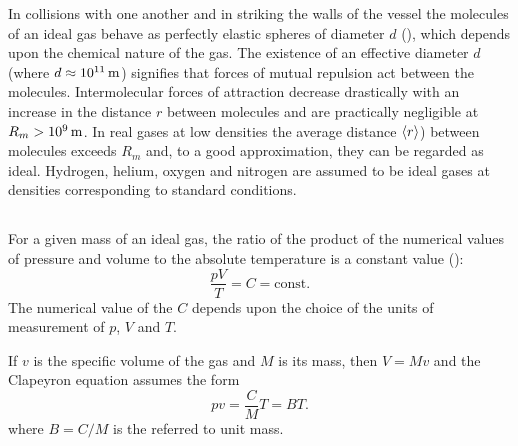 In collisions with one another and in striking the walls of the vessel the molecules of an ideal gas behave as perfectly elastic spheres  of diameter $d$ (), which depends upon the chemical nature of the gas. The existence of an effective diameter $d$ (where $d \approx \SI{d11}{\meter}$) signifies that forces of mutual repulsion  act between the molecules. Intermolecular forces of attraction  decrease drastically with an increase in the distance $r$ between molecules and are practically negligible at $ R_{m} > \SI{d9}{\meter}$. In real gases at low densities the average distance $\expval{r}$) between molecules exceeds $R_{m}$ and, to a good approximation, they can be regarded as ideal. Hydrogen, helium, oxygen and nitrogen are assumed to be ideal gases at densities corresponding to standard conditions.

\subsection{}\label{8.4.2} For a given mass of an ideal gas, the ratio of the product of the numerical values of pressure and volume to the absolute temperature is a constant value ():
\begin{equation*}%
\frac{pV}{T} = C = \textrm{const.}
\end{equation*}
The numerical value of the  $C$ depends upon the choice of the units of measurement of $p$, $V$ and $T$.

If $v$ is the specific volume of the gas  and $M$ is its mass, then $V = Mv$ and the Clapeyron equation assumes the form
\begin{equation*}%
pv = \frac{C}{M} T = BT.
\end{equation*}
where $B = C/M$ is the  referred to unit mass.

